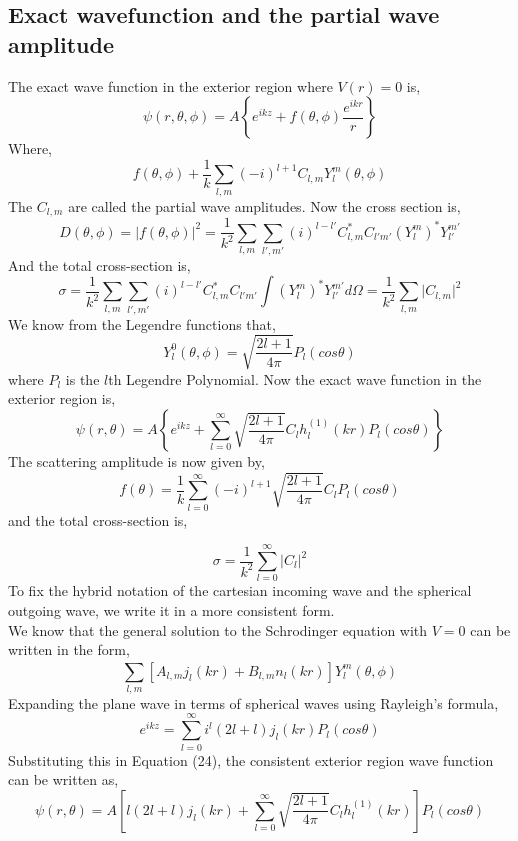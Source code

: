 \subsection{Exact wavefunction and the partial wave amplitude}
The exact wave function in the exterior region where $V(r)=0$ is,
\begin{equation}
	\psi(r,\theta,\phi)=A\left\{e^{ikz}+f(\theta,\phi)\frac{e^{ikr}}{r}\right\}
\end{equation}
Where,
\begin{equation}
	f(\theta,\phi)+\frac{1}{k}\sum_{l,m}^{}(-i)^{l+1}C_{l,m}Y^m_l(\theta,\phi)
\end{equation}
The $C_{l,m}$ are called the partial wave amplitudes. Now the cross section is,
\begin{equation}
	D(\theta,\phi)= \vert f(\theta,\phi)\vert^2= \frac{1}{k^2} \sum_{l,m}\sum_{l',m'}(i)^{l-l'}C^*_{l,m}C_{l'm'}(Y^m_l)^*Y^{m'}_{l'}
\end{equation}
And the total cross-section is,
\begin{equation}
	\sigma= \frac{1}{k^2} \sum_{l,m}\sum_{l',m'}(i)^{l-l'}C^*_{l,m}C_{l'm'}\int(Y^m_l)^*Y^{m'}_{l'}d\Omega=\frac{1}{k^2}\sum_{l,m}^{}\vert C_{l,m}\vert ^2
\end{equation}
We know from the Legendre functions that,
\begin{equation}
	Y^0_l(\theta,\phi)=\sqrt{\frac{2l+1}{4\pi}}P_l(cos\theta)
\end{equation}
where $P_l$ is the $l$th Legendre Polynomial. Now the exact wave function in the exterior region is,
\begin{equation}
	\psi(r,\theta)=A\left\{e^{ikz}+\sum_{l=0}^{\infty}\sqrt{\frac{2l+1}{4\pi}}C_lh_l^{(1)}(kr)P_l(cos\theta)\right\}
\end{equation}
The scattering amplitude is now given by,
\begin{equation}
	f(\theta)=\frac{1}{k}\sum_{l=0}^{\infty}(-i)^{l+1}\sqrt{\frac{2l+1}{4\pi}}C_lP_l(cos\theta)
\end{equation}
and the total cross-section is,

\begin{equation}
	\sigma=\frac{1}{k^2}\sum_{l=0}^{\infty}|C_l|^2
\end{equation}
To fix the hybrid notation of the cartesian incoming wave and the spherical outgoing wave, we write it in a more consistent form.\\ 
We know that the general solution to the Schrodinger equation with $V=0$ can be written in the form,
\begin{equation}
	\sum_{l,m}^{}[A_{l,m}j_l(kr)+B_{l,m}n_l(kr)]Y^m_l(\theta,\phi)
\end{equation}
Expanding the plane wave in terms of spherical waves using Rayleigh's formula,
\begin{equation}
	e^{ikz}=\sum_{l=0}^{\infty}i^l(2l+l)j_l(kr)P_l(cos\theta)
\end{equation}
Substituting this in Equation (24), the consistent exterior region wave function can be written as,
\begin{equation}
	\psi(r,\theta)=A\left[l(2l+l)j_l(kr)+\sum_{l=0}^{\infty}\sqrt{\frac{2l+1}{4\pi}}C_lh_l^{(1)}(kr)\right]P_l(cos\theta)
\end{equation}


